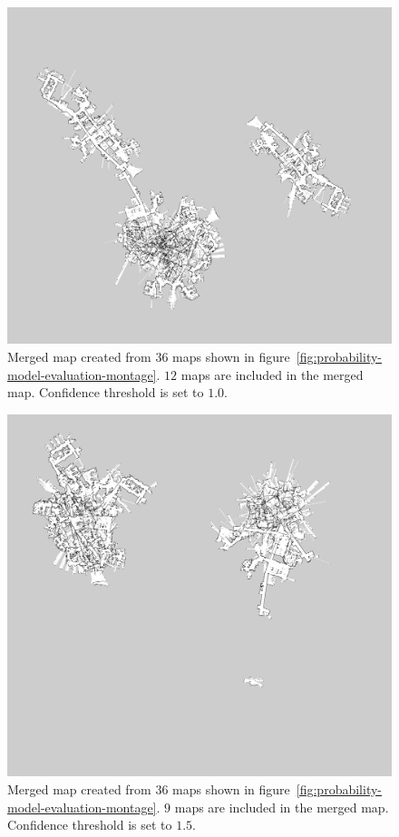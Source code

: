 \begin{figure}
    \centering
    \includegraphics[width=\textwidth]{../img/probability-model-evaluation-treshold_1_0-12maps.png}
    \caption[The merged map created with confidence threshold $1.0$.]{Merged map created from $36$ maps shown in figure~\ref{fig:probability-model-evaluation-montage}. $12$ maps are included in the merged map. Confidence threshold is set to $1.0$.}
    \label{fig:probability-model-evaluation-treshold_1.0-12maps}
\end{figure}
\begin{figure}
    \centering
    \includegraphics[width=\textwidth]{../img/probability-model-evaluation-treshold_1_5-9maps.png}
    \caption[The merged map created with confidence threshold $1.5$.]{Merged map created from $36$ maps shown in figure~\ref{fig:probability-model-evaluation-montage}. $9$ maps are included in the merged map. Confidence threshold is set to $1.5$.}
    \label{fig:probability-model-evaluation-treshold_1.5-9maps}
\end{figure}
